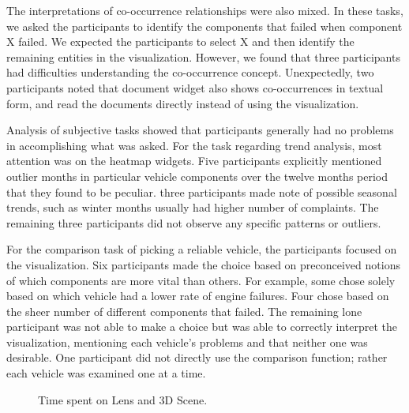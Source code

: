The interpretations of co-occurrence relationships were also mixed. In these
tasks, we asked the participants to identify the components that failed when
component X failed. We expected the participants to select X and then identify
the remaining entities in the visualization. However, we found that three participants
had difficulties understanding the co-occurrence concept. Unexpectedly, two 
participants noted that document widget also shows co-occurrences in textual
form, and read the documents directly instead of using the \threed
visualization.

Analysis of subjective tasks showed that participants generally had no problems
in accomplishing what was asked. For the task regarding trend analysis, most
attention was on the heatmap widgets. Five participants explicitly mentioned
outlier months in particular vehicle components over the twelve months period
that they found to be peculiar. three participants made note of possible seasonal trends,
such as winter months usually had higher number of complaints. The remaining three 
participants did not observe any specific patterns or outliers. 

For the comparison task of picking a reliable vehicle, the participants
focused on the \threed visualization. Six participants made the choice based on
preconceived notions of which components are more vital than others. For example,
some chose solely based on which vehicle had a lower rate of engine failures. Four
chose based on the sheer number of different components that failed. The
remaining lone participant was not able to make a choice but was able to
correctly interpret the visualization, mentioning each vehicle's problems
and that neither one was desirable. One participant did not directly use the
comparison function; rather each vehicle was examined one at a time.


 
\begin{figure}
\caption{Time spent on Lens and 3D Scene.}
\label{chart:usage}     
\end{figure}
  
